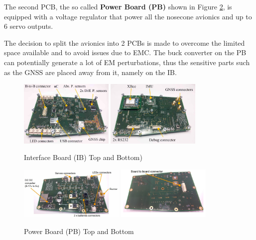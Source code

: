 The second PCB, the so called \textbf{Power Board (PB)}  shown in Figure \ref{f:avionics_pb}, is equipped with a voltage regulator that power all the nosecone avionics and up to 6 servo outputs.

The decision to split the avionics into 2 PCBs is made to overcome the limited space available and to avoid issues due to EMC. The buck converter on the PB can potentially generate a lot of EM perturbations, thus the sensitive parts such as the GNSS are placed away from it, namely on the IB.

 \begin{figure}[h!]
 	\centering
        \includegraphics[width=0.40\textwidth]{img/AV_FIG_IB_top.jpg}
          \includegraphics[width=0.40\textwidth]{img/AV_FIG_IB_bottom.jpg}
        \caption{Interface Board (IB) Top and Bottom)}
        \label{f:avionics_ib}
 \end{figure}
 
  \begin{figure}[h!]
 	\centering
        \includegraphics[width=0.45\textwidth]{img/AV_FIG_PB_top.jpg}
          \includegraphics[width=0.40\textwidth]{img/AV_FIG_PB_bottom.jpg}
        \caption{Power Board (PB) Top and Bottom}
        \label{f:avionics_pb}
 \end{figure}

